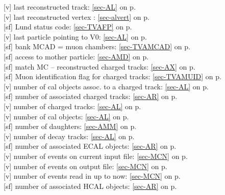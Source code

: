  [v] last reconstructed track: \ref{sec-AL} on p.~\pageref{sec-AL}\\
 [v] last reconstructed vertex  : \ref{sec-alvert} on p.~\pageref{sec-alvert}\\
 [sf] Lund status code: \ref{sec-TVAFP} on p.~\pageref{sec-TVAFP}\\
 [v] last particle pointing to V0: \ref{sec-AL} on p.~\pageref{sec-AL}\\
 [sf] bank MCAD = muon chambers: \ref{sec-TVAMCAD} on p.~\pageref{sec-TVAMCAD}\\
 [sf] access to mother particle: \ref{sec-AMD} on p.~\pageref{sec-AMD}\\
 [sf] match MC -- reconstructed charged tracks: \ref{sec-AX} on p.~\pageref{sec-AX}\\
 [sf] Muon identification flag for charged tracks:
                    \ref{sec-TVAMUID} on p.~\pageref{sec-TVAMUID}\\
 [v] number of cal objects assoc. to a charged
 track:
 \ref{sec-AL} on p.~\pageref{sec-AL}\\
 [sf] number of associated charged tracks: \ref{sec-AR} on p.~\pageref{sec-AR}\\
 [v] number of charged tracks: \ref{sec-AL} on p.~\pageref{sec-AL}\\
 [v] number of cal objects: \ref{sec-AL} on p.~\pageref{sec-AL}\\
 [sf] number of daughters: \ref{sec-AMM} on p.~\pageref{sec-AMM}\\
 [v] number of decay tracks: \ref{sec-AL} on p.~\pageref{sec-AL}\\
 [sf] number of associated ECAL objects: \ref{sec-AR} on p.~\pageref{sec-AR}\\
 [v] number of events on current input file:
 \ref{sec-MCN} on p.~\pageref{sec-MCN}\\
 [v] number of events on output file: \ref{sec-MCN} on p.~\pageref{sec-MCN}\\
 [v] number of events read in up to now:
 \ref{sec-MCN} on p.~\pageref{sec-MCN}\\
 [sf] number of associated HCAL objects: \ref{sec-AR} on p.~\pageref{sec-AR}\\
